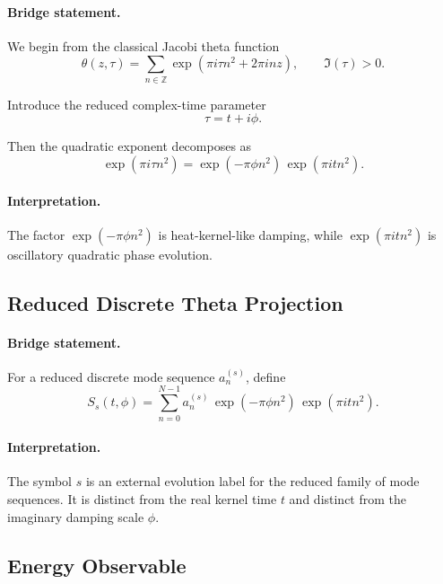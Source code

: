 \documentclass[11pt,a4paper]{article}
\begin{document}
\paragraph{Bridge statement.}
We begin from the classical Jacobi theta function
\begin{equation}
\theta(z,\tau)
=
\sum_{n \in \mathbb{Z}}
\exp\!\left(
\pi i \tau n^2 + 2\pi i n z
\right),
\qquad \Im(\tau) > 0.
\end{equation}

Introduce the reduced complex-time parameter
\begin{equation}
\tau = t + i\phi.
\end{equation}

Then the quadratic exponent decomposes as
\begin{equation}
\exp(\pi i \tau n^2)
=
\exp(-\pi \phi n^2)\,\exp(\pi i t n^2).
\end{equation}

\paragraph{Interpretation.}
The factor $\exp(-\pi \phi n^2)$ is heat-kernel-like damping, while $\exp(\pi i t n^2)$ is oscillatory quadratic phase evolution.

\subsection{Reduced Discrete Theta Projection}

\paragraph{Bridge statement.}
For a reduced discrete mode sequence $a_n^{(s)}$, define
\begin{equation}
S_s(t,\phi)
=
\sum_{n=0}^{N-1}
a_n^{(s)}\,\exp(-\pi \phi n^2)\,\exp(\pi i t n^2).
\end{equation}

\paragraph{Interpretation.}
The symbol $s$ is an external evolution label for the reduced family of mode sequences. It is distinct from the real kernel time $t$ and distinct from the imaginary damping scale $\phi$.

\subsection{Energy Observable}
\end{document}
